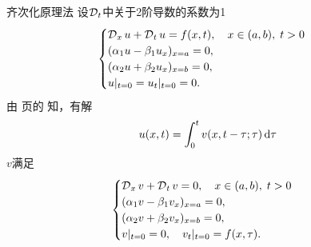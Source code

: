 \begin{method}{齐次化原理法}{}
	设$\operatorname{\mathcal D}_t$中关于2阶导数的系数为1
	\begin{align*}
		\begin{cases}
			\operatorname{\mathcal D}_xu + \operatorname{\mathcal D}_tu = f(x,t),\quad x \in (a,b),\;t > 0\\
			(\alpha_1u - \beta_1u_x)_{x=a} = 0,\\
			(\alpha_2u + \beta_2u_x)_{x=b} = 0,\\
			{u}\rvert_{t=0} = {u_t}\rvert_{t=0} = 0.
		\end{cases}
	\end{align*}
	由 \pageref{thm:Homogeneity Principle} 页的 知，有解
	\[
		u(x,t) = \int_0^tv(x,t - \tau;\tau)\mathop{}\!\mathrm{d}\tau
	\]
	$v$满足
	\begin{align*}
		\begin{cases}
			\operatorname{\mathcal D}_xv + \operatorname{\mathcal D}_tv = 0,\quad x \in (a,b),\;t > 0\\
			(\alpha_1v - \beta_1v_x)_{x=a} = 0,\\
			(\alpha_2v + \beta_2v_x)_{x=b} = 0,\\
			{v}\rvert_{t=0} = 0,\quad{v_t}\rvert_{t=0} = f(x,\tau).
		\end{cases}
	\end{align*}
\end{method}

